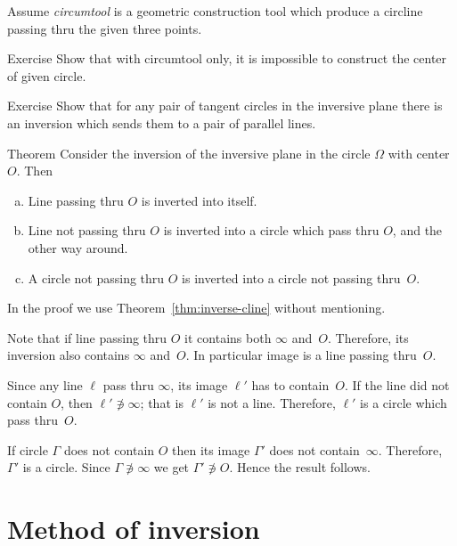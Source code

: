 Assume {}\emph{circumtool} is a geometric construction tool 
which produce a circline passing thru the given three points.



\begin{thm}{Exercise}\label{ex:circumtool}
Show that with circumtool only,
it is impossible to construct the center of given circle.
\end{thm}

\begin{thm}{Exercise}\label{ex:tangent-circ->parallels}
Show that for any pair of tangent circles in the inversive plane there is an inversion which sends them to a pair of parallel lines.
\end{thm}

\begin{thm}{Theorem}\label{thm:inverse}
Consider the inversion of the inversive plane 
in the circle $\Omega$ with center~$O$. 
Then 
\begin{enumerate}[(a)]
\item\label{thm:inverse:line-line}
Line passing thru $O$ is inverted into itself.
\item\label{thm:inverse:line} 
Line not passing thru $O$ is inverted into a circle which pass thru $O$, and the other way around.
\item\label{thm:inverse:circle} 
A circle not passing thru $O$ 
is inverted into a circle not passing thru~$O$. 
\end{enumerate}
\end{thm}

In the proof we use Theorem~\ref{thm:inverse-cline} without mentioning.

Note that if line passing thru $O$ it contains both $\infty$ and~$O$.
Therefore, its inversion also contains $\infty$ and~$O$.
In particular image is a line passing thru~$O$.

Since any line $\ell$ pass thru $\infty$, its image $\ell'$ has to contain~$O$.
If the line did not contain $O$, 
then $\ell'\not\ni \infty$;
that is $\ell'$ is not a line.
Therefore, $\ell'$ is a circle which pass thru~$O$. 

If circle $\Gamma$ does not contain $O$ 
then its image $\Gamma'$ does not contain~$\infty$.
Therefore, $\Gamma'$ is a circle.
Since  $\Gamma\not\ni\infty$ we get $\Gamma' \not\ni O$.
Hence the result follows.
\qeds

\section*{Method of inversion}

